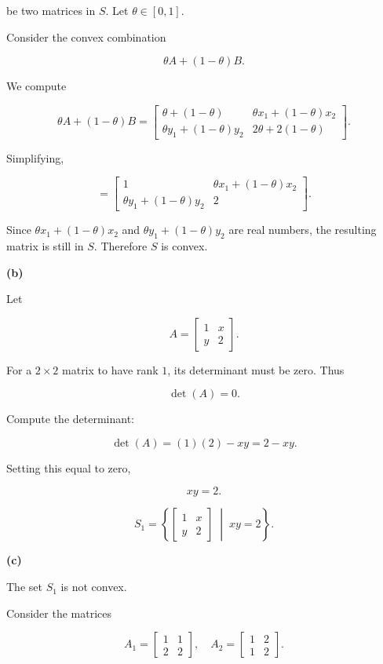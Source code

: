 \documentclass[
  12pt,
]{fphw}
\begin{document}
be two matrices in $S$. Let $\theta \in [0,1]$.

Consider the convex combination

\[
\theta A + (1-\theta)B.
\]

We compute

\[
\theta A + (1-\theta)B
=
\begin{bmatrix}
\theta + (1-\theta) & \theta x_1 + (1-\theta)x_2 \\
\theta y_1 + (1-\theta)y_2 & 2\theta + 2(1-\theta)
\end{bmatrix}.
\]

Simplifying,

\[
=
\begin{bmatrix}
1 & \theta x_1 + (1-\theta)x_2 \\
\theta y_1 + (1-\theta)y_2 & 2
\end{bmatrix}.
\]

Since $\theta x_1 + (1-\theta)x_2$ and $\theta y_1 + (1-\theta)y_2$ are real numbers, the resulting matrix is still in $S$. Therefore $S$ is convex.

\textbf{(b)}

Let

\[
A =
\begin{bmatrix}
1 & x \\
y & 2
\end{bmatrix}.
\]

For a $2\times2$ matrix to have rank $1$, its determinant must be zero. Thus

\[
\det(A) = 0.
\]

Compute the determinant:

\[
\det(A) = (1)(2) - xy = 2 - xy.
\]

Setting this equal to zero,

\[
xy = 2.
\]

\[ S_1 = \left\{ \begin{bmatrix} 1 & x \\ y & 2 \end{bmatrix} \;\middle|\; xy = 2 \right\}.  \]


\textbf{(c)}

The set $S_1$ is not convex.

Consider the matrices

\[
A_1 =
\begin{bmatrix}
1 & 1 \\
2 & 2
\end{bmatrix},
\quad
A_2 =
\begin{bmatrix}
1 & 2 \\
1 & 2
\end{bmatrix}.
\]
\end{document}
